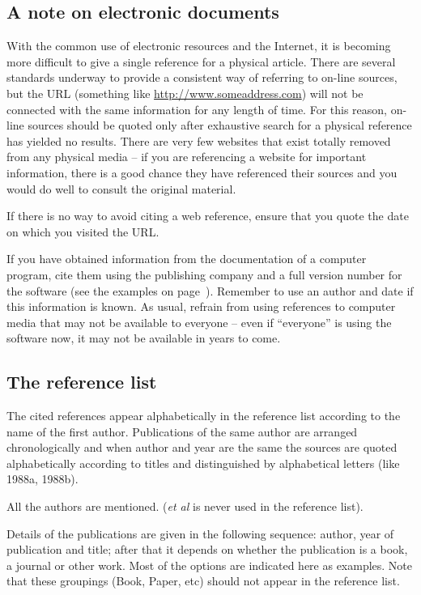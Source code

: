 \documentclass[a5paper, 10pt]{article}
\begin{document}
\subsection{A note on electronic documents}
With the common use of electronic resources and the Internet, it is
becoming more difficult to give a single reference for a physical
article.  There are several standards underway to provide a consistent
way of referring to on-line sources, but the URL (something like
\url{http://www.someaddress.com}) will not be connected with the same
information for any length of time.  For this reason, on-line sources
should be quoted only after exhaustive search for a physical reference
has yielded no results.  There are very few websites that exist
totally removed from any physical media -- if you are referencing a
website for important information, there is a good chance they have
referenced their sources and you would do well to consult the original
material.

If there is no way to avoid citing a web reference, ensure that you
quote the date on which you visited the URL.

If you have obtained information from the documentation of a computer
program, cite them using the publishing company and a full version
number for the software (see the examples on
page~\pageref{page:ref_compsoftware}).  Remember to use an author and date
if this information is known.  As usual, refrain from using references
to computer media that may not be available to everyone -- even if
``everyone'' is using the software now, it may not be available in
years to come.

\subsection{The reference list}
\label{sec:referencelist}

The cited references appear alphabetically in the reference list
according to the name of the first author.  Publications of the same
author are arranged chronologically and when author and year are the
same the sources are quoted alphabetically according to titles and
distinguished by alphabetical letters (like 1988a, 1988b).

All the authors are mentioned.  (\emph{et al}  is never used in the
reference list).

Details of the publications are given in the following sequence:
author, year of publication and title; after that it depends on
whether the publication is a book, a journal or other work.  Most of
the options are indicated here as examples.  
Note that these groupings (Book, Paper, etc) should not appear in the reference list.
\end{document}
